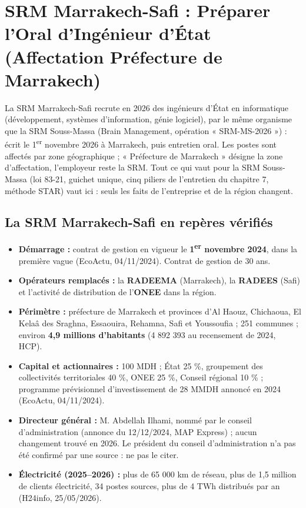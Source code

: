 \chapter{SRM Marrakech-Safi : Préparer l'Oral d'Ingénieur d'État (Affectation Préfecture de Marrakech)}

\begin{tcolorbox}[colback=red!4!white,colframe=red!60!black,title=\textbf{Pourquoi ce chapitre (ajouté le 19 novembre 2026)}]
La SRM Marrakech-Safi recrute en 2026 des ingénieurs d'État en informatique (développement, systèmes d'information, génie logiciel), par le même organisme que la SRM Souss-Massa (Brain Management, opération « SRM-MS-2026 ») : écrit le 1\textsuperscript{er} novembre 2026 à Marrakech, puis entretien oral. Les postes sont affectés par zone géographique ; « Préfecture de Marrakech » désigne la zone d'affectation, l'employeur reste la SRM. Tout ce qui vaut pour la SRM Souss-Massa (loi 83-21, guichet unique, cinq piliers de l'entretien du chapitre 7, méthode STAR) vaut ici : seuls les faits de l'entreprise et de la région changent.
\end{tcolorbox}

\section{La SRM Marrakech-Safi en repères vérifiés}
\begin{itemize}
    \item \textbf{Démarrage :} contrat de gestion en vigueur le \textbf{1\textsuperscript{er} novembre 2024}, dans la première vague (EcoActu, 04/11/2024). Contrat de gestion de 30 ans.
    \item \textbf{Opérateurs remplacés :} la \textbf{RADEEMA} (Marrakech), la \textbf{RADEES} (Safi) et l'activité de distribution de l'\textbf{ONEE} dans la région.
    \item \textbf{Périmètre :} préfecture de Marrakech et provinces d'Al Haouz, Chichaoua, El Kelaâ des Sraghna, Essaouira, Rehamna, Safi et Youssoufia ; 251 communes ; environ \textbf{4,9 millions d'habitants} (4 892 393 au recensement de 2024, HCP).
    \item \textbf{Capital et actionnaires :} 100 MDH ; État 25 \%, groupement des collectivités territoriales 40 \%, ONEE 25 \%, Conseil régional 10 \% ; programme prévisionnel d'investissement de 28 MMDH annoncé en 2024 (EcoActu, 04/11/2024).
    \item \textbf{Directeur général :} M. Abdellah Ilhami, nommé par le conseil d'administration (annonce du 12/12/2024, MAP Express) ; aucun changement trouvé en 2026. Le président du conseil d'administration n'a pas été confirmé par une source : ne pas le citer.
    \item \textbf{Électricité (2025--2026) :} plus de 65 000 km de réseau, plus de 1,5 million de clients électricité, 34 postes sources, plus de 4 TWh distribués par an (H24info, 25/05/2026).
\end{itemize}

